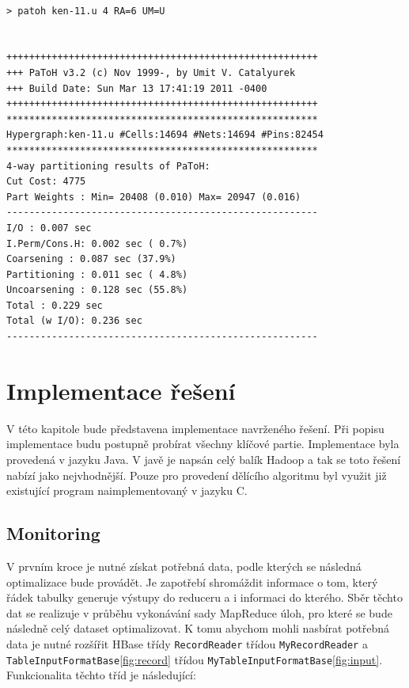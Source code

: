 \documentclass[thesis=M,czech]{FITthesis}[2012/06/26]
\begin{document}
\medskip
\begin{lstlisting}[frame=single]  % Start your code-block
 
> patoh ken-11.u 4 RA=6 UM=U 
 
 
+++++++++++++++++++++++++++++++++++++++++++++++++++++++
+++ PaToH v3.2 (c) Nov 1999-, by Umit V. Catalyurek
+++ Build Date: Sun Mar 13 17:41:19 2011 -0400
+++++++++++++++++++++++++++++++++++++++++++++++++++++++
*******************************************************
Hypergraph:ken-11.u #Cells:14694 #Nets:14694 #Pins:82454
*******************************************************
4-way partitioning results of PaToH:
Cut Cost: 4775
Part Weights : Min= 20408 (0.010) Max= 20947 (0.016)
-------------------------------------------------------
I/O : 0.007 sec
I.Perm/Cons.H: 0.002 sec ( 0.7%)
Coarsening : 0.087 sec (37.9%)
Partitioning : 0.011 sec ( 4.8%)
Uncoarsening : 0.128 sec (55.8%)
Total : 0.229 sec
Total (w I/O): 0.236 sec
-------------------------------------------------------

\end{lstlisting}
\medskip

\chapter{Implementace řešení}
V této kapitole bude představena implementace navrženého řešení. Při popisu implementace budu postupně probírat všechny klíčové partie. Implementace byla provedená v jazyku Java. V javě je napsán celý balík Hadoop a tak se toto řešení nabízí jako nejvhodnější. Pouze pro provedení dělícího algoritmu byl využit již existující program naimplementovaný v jazyku C. 

\section{Monitoring}
V prvním kroce je nutné získat potřebná data, podle kterých se následná optimalizace bude provádět. Je zapotřebí shromáždit informace o tom, který řádek tabulky generuje výstupy do reduceru a i informaci do kterého. Sběr těchto dat se realizuje v průběhu vykonávání sady MapReduce úloh, pro které se bude následně celý dataset optimalizovat. K tomu abychom mohli nasbírat potřebná data je nutné rozšířit HBase třídy \texttt{RecordReader} třídou \texttt{MyRecordReader} a \texttt{TableInputFormatBase}\ref{fig:record} třídou \texttt{MyTableInputFormatBase}\ref{fig:input}. Funkcionalita těchto tříd je následující:
\end{document}
